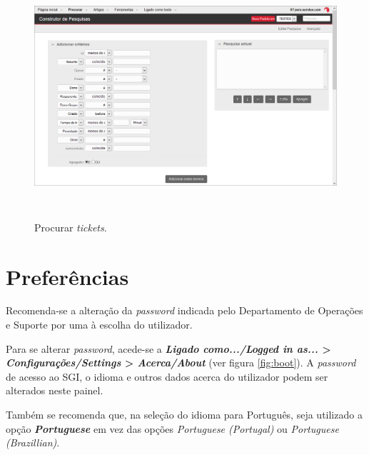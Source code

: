 \begin{figure}[H]
\begin{center}
\includegraphics[width=16cm,height=9cm]{include/img/rt4-1-PT}
\end{center}
\caption{Procurar \textit{tickets}.}
\label{fig:rt4}
\end{figure}

\section{Preferências}
Recomenda-se a alteração da \textit{password} indicada pelo Departamento de Operações e Suporte por uma à escolha do utilizador.

Para se alterar \textit{password}, acede-se a \textbf{\emph{Ligado como.../\textit{Logged in as...}} > \emph{Configurações/\textit{Settings}} > \emph{Acerca/\textit{About}}} (ver figura \ref{fig:boot}). A \textit{password} de acesso ao SGI, o idioma e outros dados acerca do utilizador podem ser alterados neste painel.

Também se recomenda que, na seleção do idioma para Português, seja utilizado a opção \textbf{\textit{Portuguese}} em vez das opções \textit{Portuguese (Portugal)} ou \textit{Portuguese (Brazillian)}.

